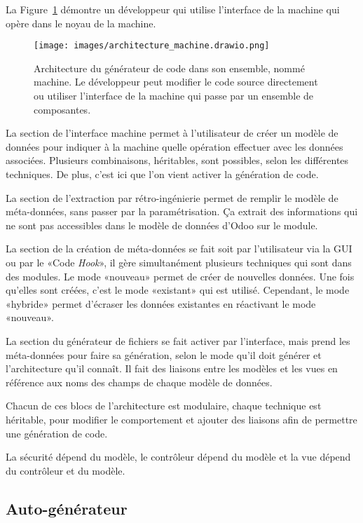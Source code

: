 La Figure~\ref{fig:dia_architecture} démontre un développeur qui utilise l'interface de la machine qui opère dans le noyau de la machine.

\begin{figure}
\centering
\texttt{[image: images/architecture\_machine.drawio.png]}
\caption{Architecture du générateur de code dans son ensemble, nommé machine. Le développeur peut modifier le code source directement ou utiliser l'interface de la machine qui passe par un ensemble de composantes.}
\label{fig:dia_architecture}
\end{figure}

La section de l’interface machine permet à l’utilisateur de créer un modèle de données pour indiquer à la machine quelle opération effectuer avec les données associées. Plusieurs combinaisons, héritables, sont possibles, selon les différentes techniques. De plus, c’est ici que l’on vient activer la génération de code.

La section de l’extraction par rétro-ingénierie permet de remplir le modèle de méta-données, sans passer par la paramétrisation. Ça extrait des informations qui ne sont pas accessibles dans le modèle de données d’Odoo sur le module.

La section de la création de méta-données se fait soit par l’utilisateur via la GUI ou par le «Code \textit{Hook}», il gère simultanément plusieurs techniques qui sont dans des modules. Le mode «nouveau» permet de créer de nouvelles données. Une fois qu’elles sont créées, c’est le mode «existant» qui est utilisé. Cependant, le mode «hybride» permet d’écraser les données existantes en réactivant le mode «nouveau».

La section du générateur de fichiers se fait activer par l’interface, mais prend les méta-données pour faire sa génération, selon le mode qu’il doit générer et l’architecture qu’il connaît. Il fait des liaisons entre les modèles et les vues en référence aux noms des champs de chaque modèle de données.

Chacun de ces blocs de l’architecture est modulaire, chaque technique est héritable, pour modifier le comportement et ajouter des liaisons afin de permettre une génération de code.

La sécurité dépend du modèle, le contrôleur dépend du modèle et la vue dépend du contrôleur et du modèle.

\subsection{Auto-générateur}

